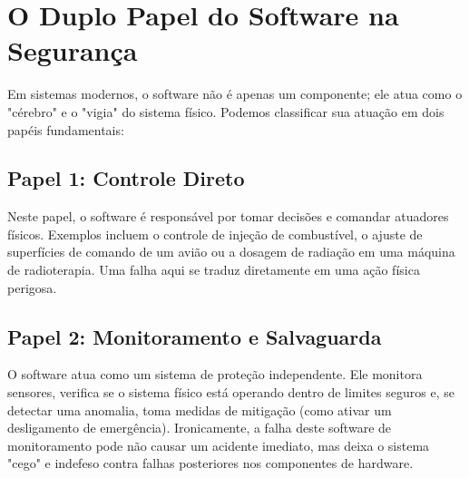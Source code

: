 \documentclass[12pt,a4paper]{report}
\begin{document}
\section{O Duplo Papel do Software na Segurança}

Em sistemas modernos, o software não é apenas um componente; ele atua como o "cérebro" e o "vigia" do sistema físico. Podemos classificar sua atuação em dois papéis fundamentais:

\subsection{Papel 1: Controle Direto}
Neste papel, o software é responsável por tomar decisões e comandar atuadores físicos. Exemplos incluem o controle de injeção de combustível, o ajuste de superfícies de comando de um avião ou a dosagem de radiação em uma máquina de radioterapia. Uma falha aqui se traduz diretamente em uma ação física perigosa.

\subsection{Papel 2: Monitoramento e Salvaguarda}
O software atua como um sistema de proteção independente. Ele monitora sensores, verifica se o sistema físico está operando dentro de limites seguros e, se detectar uma anomalia, toma medidas de mitigação (como ativar um desligamento de emergência). Ironicamente, a falha deste software de monitoramento pode não causar um acidente imediato, mas deixa o sistema "cego" e indefeso contra falhas posteriores nos componentes de hardware.
\end{document}
